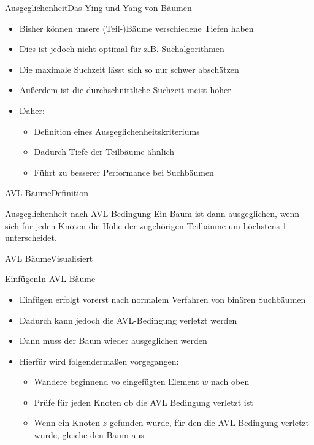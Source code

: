 \begin{frame}{Ausgeglichenheit}{Das Ying und Yang von Bäumen}
	\begin{itemize}
		\item Bisher können unsere (Teil-)Bäume verschiedene Tiefen haben
		\item Dies ist jedoch nicht optimal für z.B. Suchalgorithmen
		\item Die maximale Suchzeit lässt sich so nur schwer abschätzen
		\item Außerdem ist die durchschnittliche Suchzeit meist höher
		\item Daher:
		\begin{itemize}
			\item Definition eines Ausgeglichenheitskriteriums
			\item Dadurch Tiefe der Teilbäume ähnlich
			\item Führt zu besserer Performance bei Suchbäumen
		\end{itemize}
	\end{itemize}
\end{frame}

\begin{frame}{AVL Bäume}{Definition}
	\vfill
	\begin{alertblock}{Ausgeglichenheit nach AVL-Bedingung}
	Ein Baum ist dann ausgeglichen, wenn sich für jeden Knoten die Höhe der zugehörigen Teilbäume um
	höchstens 1 unterscheidet.
	\end{alertblock}
	\vfill
\end{frame}

\begin{frame}{AVL Bäume}{Visualisiert}
\end{frame}

\begin{frame}{Einfügen}{In AVL Bäume}
	\begin{itemize}
		\item Einfügen erfolgt vorerst nach normalem Verfahren von binären Suchbäumen
		\item Dadurch kann jedoch die AVL-Bedingung verletzt werden
		\item Dann muss der Baum wieder ausgeglichen werden
		\item Hierfür wird folgendermaßen vorgegangen:
		\begin{itemize}
			\item Wandere beginnend vo eingefügten Element $w$ nach oben
			\item Prüfe für jeden Knoten ob die AVL Bedingung verletzt ist
			\item Wenn ein Knoten $z$ gefunden wurde, für den die AVL-Bedingung verletzt wurde, gleiche den Baum aus
		\end{itemize}
	\end{itemize}
\end{frame}

